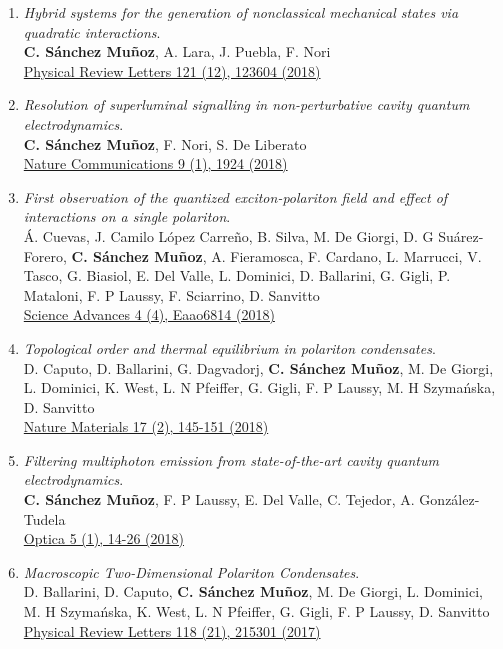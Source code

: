 \begin{enumerate}
 \item \emph{Hybrid systems for the generation of nonclassical mechanical states via quadratic interactions}.\\ 
{\textbf{C. Sánchez Muñoz}, A. Lara, J. Puebla, F. Nori}\\ 
  \href{https://journals.aps.org/prl/abstract/10.1103/PhysRevLett.121.123604}{{Physical Review Letters 121 (12), 123604 (2018)}}

 \item \emph{Resolution of superluminal signalling in non-perturbative cavity quantum electrodynamics}.\\ 
{\textbf{C. Sánchez Muñoz}, F. Nori, S. De Liberato}\\ 
  \href{https://www.nature.com/articles/s41467-018-04339-w}{{Nature Communications 9 (1), 1924 (2018)}}

 \item \emph{First observation of the quantized exciton-polariton field and effect of interactions on a single polariton}.\\ 
{Á. Cuevas, J. Camilo López Carreño, B. Silva, M. De Giorgi, D. G Suárez-Forero, \textbf{C. Sánchez Muñoz}, A. Fieramosca, F. Cardano, L. Marrucci, V. Tasco, G. Biasiol, E. Del Valle, L. Dominici, D. Ballarini, G. Gigli, P. Mataloni, F. P Laussy, F. Sciarrino, D. Sanvitto}\\ 
  \href{https://www.science.org/doi/abs/10.1126/sciadv.aao6814}{{Science Advances 4 (4), Eaao6814 (2018)}}

 \item \emph{Topological order and thermal equilibrium in polariton condensates}.\\ 
{D. Caputo, D. Ballarini, G. Dagvadorj, \textbf{C. Sánchez Muñoz}, M. De Giorgi, L. Dominici, K. West, L. N Pfeiffer, G. Gigli, F. P Laussy, M. H Szymańska, D. Sanvitto}\\ 
  \href{https://www.nature.com/articles/nmat5039}{{Nature Materials 17 (2), 145-151 (2018)}}

 \item \emph{Filtering multiphoton emission from state-of-the-art cavity quantum electrodynamics}.\\ 
{\textbf{C. Sánchez Muñoz}, F. P Laussy, E. Del Valle, C. Tejedor, A. González-Tudela}\\ 
  \href{https://opg.optica.org/abstract.cfm?uri=optica-5-1-14}{{Optica 5 (1), 14-26 (2018)}}

 \item \emph{Macroscopic Two-Dimensional Polariton Condensates}.\\ 
{D. Ballarini, D. Caputo, \textbf{C. Sánchez Muñoz}, M. De Giorgi, L. Dominici, M. H Szymańska, K. West, L. N Pfeiffer, G. Gigli, F. P Laussy, D. Sanvitto}\\ 
  \href{https://journals.aps.org/prl/abstract/10.1103/PhysRevLett.118.215301}{{Physical Review Letters 118 (21), 215301 (2017)}}


\end{enumerate}
